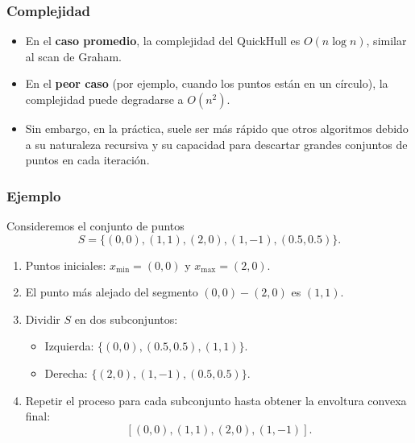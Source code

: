 \documentclass[12pt]{book}
\theoremstyle{definition}
\theoremstyle{plain}
\theoremstyle{remark}
\begin{document}
\subsubsection{Complejidad}
\begin{itemize}
    \item En el \textbf{caso promedio}, la complejidad del QuickHull es \( O(n \log n) \), similar al scan de Graham.
    \item En el \textbf{peor caso} (por ejemplo, cuando los puntos están en un círculo), la complejidad puede degradarse a \( O(n^2) \).
    \item Sin embargo, en la práctica, suele ser más rápido que otros algoritmos debido a su naturaleza recursiva y su capacidad para descartar grandes conjuntos de puntos en cada iteración.
\end{itemize}

\subsubsection{Ejemplo}
Consideremos el conjunto de puntos \[ S = \{(0,0), (1,1), (2,0), (1,-1), (0.5,0.5)\}. \]
\begin{enumerate}
    \item Puntos iniciales: \( x_{\min} = (0,0) \) y \( x_{\max} = (2,0) \).
    \item El punto más alejado del segmento \( (0,0)-(2,0) \) es \( (1,1) \).
    \item Dividir \( S \) en dos subconjuntos:
    \begin{itemize}
        \item Izquierda: \( \{(0,0), (0.5,0.5), (1,1)\} \).
        \item Derecha: \( \{(2,0), (1,-1), (0.5,0.5)\} \).
    \end{itemize}
    \item Repetir el proceso para cada subconjunto hasta obtener la envoltura convexa final: \[ [(0,0), (1,1), (2,0), (1,-1)]. \]
\end{enumerate}

%
%
%
%
\end{document}
